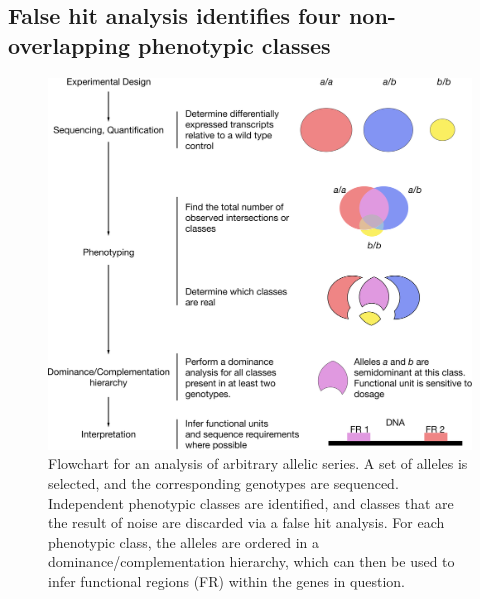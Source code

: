 \documentclass[9pt,twocolumn,twoside]{gsajnl}
\begin{document}
\subsection*{False hit analysis identifies four non-overlapping phenotypic
             classes}

\begin{figure}
 \centering{}
 \includegraphics[width=\textwidth]{../figs/flowchart.pdf}
 \caption{
         Flowchart for an analysis of arbitrary allelic series. A set of alleles
         is selected, and the corresponding genotypes are sequenced. Independent
         phenotypic classes are identified, and classes that are the result of
         noise are discarded via a false hit analysis. For each phenotypic
         class, the alleles are ordered in a dominance/complementation
         hierarchy, which can then be used to infer functional regions (FR)
         within the genes in question.
         }
\label{fig:flowchart}
\end{figure}
\end{document}

